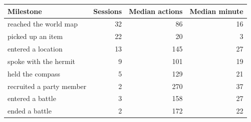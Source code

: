 \begin{tabular}{@{}lrrr@{}}
\toprule
Milestone & Sessions & Median actions & Median minute \\
\midrule
reached the world map & 32 & 86 & 16 \\
picked up an item & 22 & 20 & 3 \\
entered a location & 13 & 145 & 27 \\
spoke with the hermit & 9 & 101 & 19 \\
held the compass & 5 & 129 & 21 \\
recruited a party member & 2 & 270 & 37 \\
entered a battle & 3 & 158 & 27 \\
ended a battle & 2 & 172 & 22 \\
\bottomrule
\end{tabular}
